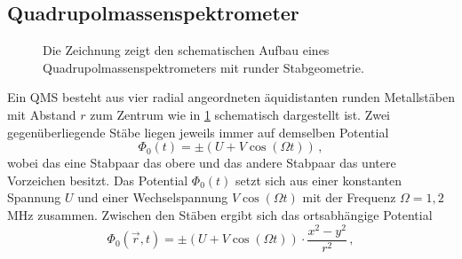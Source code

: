 \subsection{Quadrupolmassenspektrometer}\label{subsec:quadrupolmassenspektrometer}
\begin{figure}[h]
 	\centering
	\caption[Quadrupolmassenspektrometer,
	schematisch]{Die Zeichnung zeigt den schematischen Aufbau eines
	Quadrupolmassenspektrometers mit runder
	Stabgeometrie.}\label{fig:quadrupolmassenspektrometer}
\end{figure}
Ein QMS besteht aus vier radial angeordneten äquidistanten runden
Metallstäben mit Abstand $r$ zum Zentrum wie in
\ref{fig:quadrupolmassenspektrometer} schematisch dargestellt ist. Zwei gegenüberliegende Stäbe liegen jeweils immer auf demselben Potential
\begin{equation}\label{eq:qms_potential_0}
	\Phi_0(t)=\pm\left(U+V\cos{(\Omega t)}\right)\,,
\end{equation}
wobei das eine Stabpaar das obere und das andere Stabpaar das untere Vorzeichen
besitzt. Das Potential $\Phi_0(t)$ setzt sich aus einer konstanten Spannung $U$
und einer Wechselspannung $V\cos{(\Omega t)}$ mit der Frequenz $\Omega=1,2\,$MHz
zusammen. Zwischen den Stäben ergibt sich das ortsabhängige Potential
\begin{equation}\label{eq:qms_potential_ort}
	\Phi_0(\vec{r},t)=\pm\left(U+V\cos{(\Omega
	t)}\right)\cdot\frac{x^2-y^2}{r^2}\,,
\end{equation}
